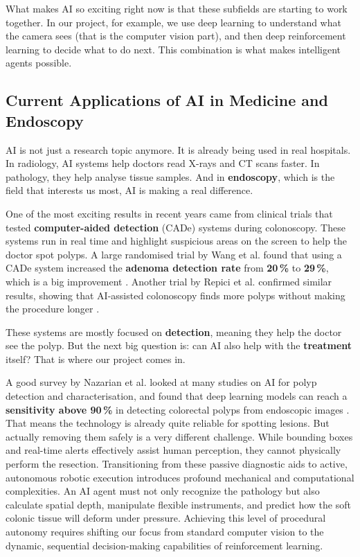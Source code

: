 What makes AI so exciting right now is that these subfields are starting to work together. In our project, for example, we use deep learning to understand what the camera sees (that is the computer vision part), and then deep reinforcement learning to decide what to do next. This combination is what makes intelligent agents possible.

\subsection{Current Applications of AI in Medicine and Endoscopy}

AI is not just a research topic anymore. It is already being used in real hospitals. In radiology, AI systems help doctors read X-rays and CT scans faster. In pathology, they help analyse tissue samples. And in \textbf{endoscopy}, which is the field that interests us most, AI is making a real difference.

One of the most exciting results in recent years came from clinical trials that tested \textbf{computer-aided detection} (CADe) systems during colonoscopy. These systems run in real time and highlight suspicious areas on the screen to help the doctor spot polyps. A large randomised trial by Wang et al. found that using a CADe system increased the \textbf{adenoma detection rate} from \textbf{20\,\%} to \textbf{29\,\%}, which is a big improvement \cite{wang2019cade}. Another trial by Repici et al. confirmed similar results, showing that AI-assisted colonoscopy finds more polyps without making the procedure longer \cite{repici2020cade}.

These systems are mostly focused on \textbf{detection}, meaning they help the doctor see the polyp. But the next big question is: can AI also help with the \textbf{treatment} itself? That is where our project comes in.

A good survey by Nazarian et al. looked at many studies on AI for polyp detection and characterisation, and found that deep learning models can reach a \textbf{sensitivity above 90\,\%} in detecting colorectal polyps from endoscopic images \cite{nazarian2021jmir}. That means the technology is already quite reliable for spotting lesions. But actually removing them safely is a very different challenge. While bounding boxes and real-time alerts effectively assist human perception, they cannot physically perform the resection. Transitioning from these passive diagnostic aids to active, autonomous robotic execution introduces profound mechanical and computational complexities. An AI agent must not only recognize the pathology but also calculate spatial depth, manipulate flexible instruments, and predict how the soft colonic tissue will deform under pressure. Achieving this level of procedural autonomy requires shifting our focus from standard computer vision to the dynamic, sequential decision-making capabilities of reinforcement learning.
